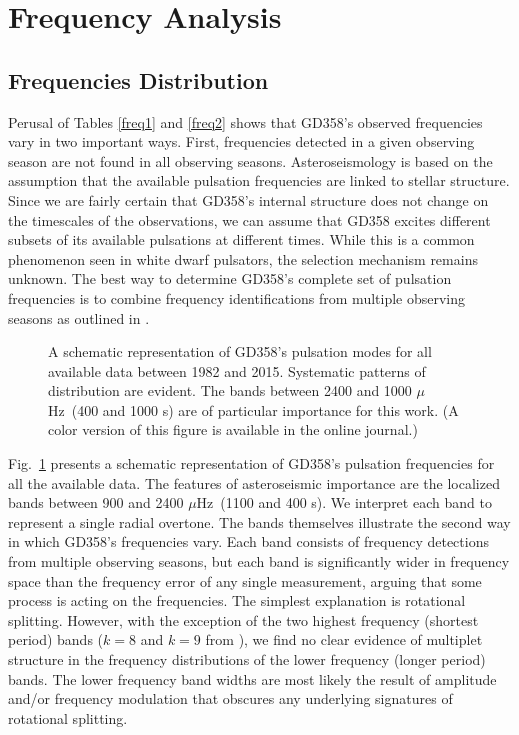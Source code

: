 \documentclass[12pt,preprint]{aastex}
\newcommand{\muHz}{\mbox{$\mu$Hz}}
\begin{document}
\section{Frequency Analysis}\label{analysis}

\subsection{Frequencies Distribution}

Perusal of Tables \ref{freq1} and \ref{freq2} shows that GD358's observed frequencies vary in two
important ways.  First, frequencies detected in a given observing season are not found 
in all observing seasons. Asteroseismology is based on the assumption that the available pulsation
frequencies are linked to stellar structure.  Since we are fairly certain that GD358's internal structure 
does not change on the timescales of the observations, we can assume that GD358 excites 
different subsets of its available pulsations at different times. While this is a common phenomenon
seen in white dwarf pulsators, the selection mechanism remains unknown. The best way to 
determine GD358's complete set of pulsation frequencies is to combine frequency identifications 
from multiple observing seasons as outlined in \citet{Kleinman98}.  

\begin{figure}
\caption{A schematic representation of GD358's pulsation modes for all available data between
1982 and 2015. Systematic patterns of distribution are evident. The bands between 2400 and 1000
\muHz\ (400 and 1000 s) are of particular importance for this work. (A color version of this 
figure is available in the online journal.)
\label{schematic}
}
\end{figure}

Fig.~\ref{schematic} presents a schematic representation of GD358's pulsation frequencies for all the 
available data. The features of asteroseismic importance are the localized bands between 900 and 2400
\muHz\ (1100 and 400 s). We interpret each band to represent a single radial overtone. The bands
themselves illustrate the second way in which GD358's frequencies vary. Each band consists of 
frequency detections from multiple observing seasons, but each band is significantly wider in 
frequency space than the frequency error of any single measurement, arguing that some process 
is acting on the frequencies. The simplest explanation is rotational splitting.  However, with the 
exception of the two highest frequency (shortest period) bands ($k=8$ and $k=9$ 
from \citet{Provencal09}), we find no clear evidence of multiplet structure in the frequency 
distributions of the lower frequency (longer period) bands. The lower frequency band widths are 
most likely the result of amplitude and/or frequency modulation that obscures any underlying 
signatures of rotational splitting.  
\end{document}
